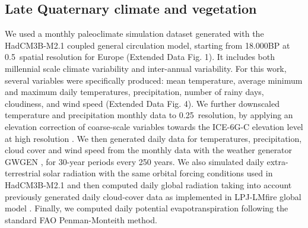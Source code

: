 \documentclass[pdflatex, sn-nature]{sn-jnl}%
\begin{document}
\subsection{Late Quaternary climate and vegetation}\label{paleodata}
We used a monthly paleoclimate simulation dataset \cite{Armstrong2019} generated with the HadCM3B-M2.1 coupled general circulation model, starting from 18.000BP at 0.5\degree~spatial resolution for Europe (Extended Data Fig. 1). It includes both millennial scale climate variability and inter-annual variability. For this work, several variables were specifically produced: mean temperature, average minimum and maximum daily temperatures, precipitation, number of rainy days, cloudiness, and wind speed (Extended Data Fig. 4). We further downscaled temperature and precipitation monthly data to 0.25\degree~resolution, by applying an elevation correction of coarse-scale variables towards the ICE-6G-C elevation level at high resolution \cite{Peltier2015}.  
We then generated daily data for temperatures, precipitation, cloud cover and wind speed from  the monthly data with the weather generator GWGEN \cite{Sommer2017}, for 30-year periods every 250 years. We also simulated daily extra-terrestrial solar radiation with the same orbital forcing conditions used in HadCM3B-M2.1 \cite{Armstrong2019} and then computed daily global radiation taking into account previously generated daily cloud-cover data as implemented in LPJ-LMfire global model \cite{Pfeiffer2013}. Finally, we computed daily potential evapotranspiration following the standard FAO Penman-Monteith method.  
\end{document}
